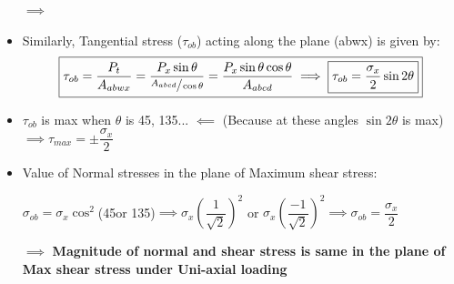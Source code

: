 \documentclass[8pt]{report}
\begin{document}
\begin{itemize}
		  \item[$\implies$] 
		  \item Similarly, Tangential stress ($\tau_{ob}$) acting along the plane (abwx) is given by: $$\boxed{\tau_{ob} = \dfrac{P_t}{A_{abwx}} = \dfrac{P_x\sin\theta}{\sfrac{A_{abcd}}{\cos\theta}} = \dfrac{P_x\sin\theta \cos\theta}{A_{abcd}} \implies \boxed{\tau_{ob} = \dfrac{\sigma_x}{2}\sin 2\theta}}$$
		  \item $\tau_{ob}$ is max when $\theta$ is 45\textdegree , 135\textdegree ... $\impliedby$ (Because at these angles $\sin 2\theta$ is max) $\implies\boxed{\tau_{max} = \pm\dfrac{\sigma_x}{2}}$
		  \item Value of Normal stresses in the plane of Maximum shear stress: 
		  \item[]  $\sigma_{ob} = \sigma_x\cos^2$(45\textdegree or 135\textdegree)$\implies \sigma_x\left(\dfrac{1}{\sqrt{2}}\right)^2$ or $\sigma_x\left(\dfrac{-1}{\sqrt{2}}\right)^2\implies \boxed{\sigma_{ob}=\dfrac{\sigma_x}{2}}$
		  \item[$\implies$] \textbf{Magnitude of normal and shear stress is same in the plane of Max shear stress under Uni-axial loading}
		\end{itemize}\hrulefill
\end{document}
